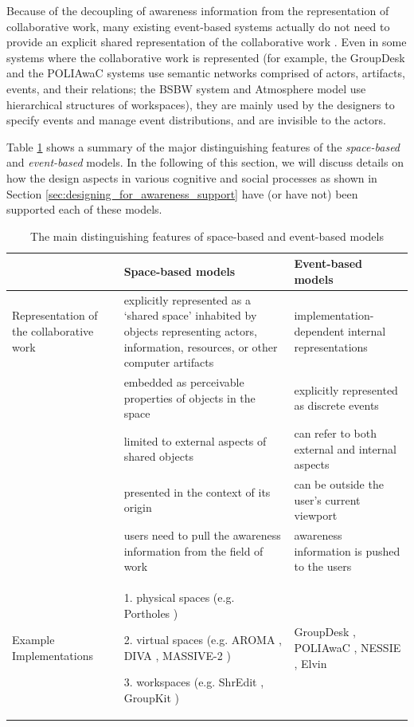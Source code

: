 Because of the decoupling of awareness information from the representation of collaborative work, many existing event-based systems actually do not need to provide an explicit shared representation of the collaborative work \cite{prinz1999a,Fitzpatrick2002}.  Even in some systems where the collaborative work is represented (for example, the GroupDesk \cite{Fuchs1995} and the POLIAwaC systems \cite{sohlenkamp2000po} use semantic networks comprised of actors, artifacts, events, and their relations; the BSBW system \cite{Bentley1995} and Atmosphere model \cite{Rittenbruch2002} use hierarchical structures of workspaces), they are mainly used by the designers to specify events and manage event distributions, and are invisible to the actors.

Table \ref{tab:awareness_models} shows a summary of the major distinguishing features of the \emph{space-based} and \emph{event-based} models. In the following of this section, we will discuss details on how the design aspects in various cognitive and social processes as shown in Section \ref{sec:designing_for_awareness_support} have (or have not) been supported each of these models.

\begin{table}[htbp]
\centering
\footnotesize
\begin{tabular}{>{\raggedright}p{1.1in}>{\raggedright}p{2.2in}>{\raggedright}p{2.2in}}
\toprule 
 & \textbf{Space-based models} & \textbf{Event-based models}\tabularnewline
\midrule 
Representation of the collaborative work & explicitly represented as a `shared space' inhabited by objects representing
actors, information, resources, or other computer artifacts  & implementation-dependent internal representations\tabularnewline
\midrule 
\multirow{4}{1.1in}{Awareness information} & embedded as perceivable properties of objects in the space & explicitly represented as discrete events\tabularnewline
\cmidrule{2-3} 
 & limited to external aspects of shared objects  & can refer to both external and internal aspects\tabularnewline
\cmidrule{2-3} 
 & presented in the context of its origin & can be outside the user's current viewport\tabularnewline
\cmidrule{2-3} 
 & users need to pull the awareness information from the field of work & awareness information is pushed to the users\tabularnewline
\midrule 
Example Implementations & 1. physical spaces (e.g. Portholes \cite{Dourish1992})

2. virtual spaces (e.g. AROMA \cite{Pedersen1997},
DIVA \cite{Berlage1999}, MASSIVE-2 \cite{Benford2001})

3. workspaces (e.g. ShrEdit \cite{dourish1992awareness},
GroupKit \cite{Roseman1996}) & GroupDesk \cite{Fuchs1995}, POLIAwaC \cite{sohlenkamp2000po},
NESSIE \cite{prinz1999a}, Elvin \cite{Fitzpatrick2002}\tabularnewline
\bottomrule
\end{tabular}  
\caption{The main distinguishing features of space-based and event-based models}
\label{tab:awareness_models}
\end{table}

